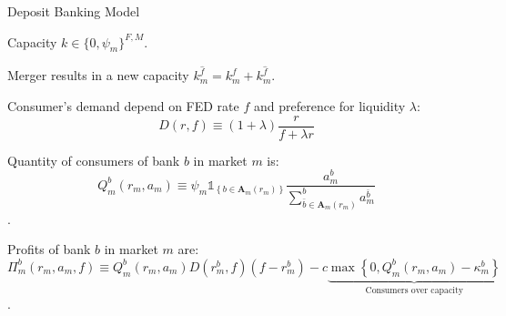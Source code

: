 \documentclass[notes,10.2pt, aspectratio=169]{beamer}
\newenvironment{wideitemize}{\itemize\addtolength{\itemsep}{10pt}}{\enditemize}
\begin{document}
\begin{frame}{  Deposit Banking Model}
  \vspace{0.2cm}
\begin{wideitemize}
  \item Capacity $k \in \{ 0, \psi_m\}^{F,M}$.

  \item Merger results in a new capacity $k^{\hat{f}}_m = k^f_m + k^{\hat{f}}_m$.
  \item Consumer's demand depend on FED rate $f$ and preference for liquidity $\lambda$:
  $$D(r, f) \equiv(1+\lambda) \frac{r}{f+\lambda r}$$
  \item Quantity of consumers of bank $b$ in market $m$ is:
  $$Q_m^b\left(r_m, a_m\right) \equiv \psi_m \mathbb{1}_{\left\{b \in \mathbf{A}_m\left(r_m\right)\right\}} \frac{a_m^b}{\sum_{\bar{b} \in \mathbf{A}_m\left(r_m\right)}^b a_m^{\bar{b}}}$$.
  \item Profits of bank $b$ in market $m$ are:
  $$\Pi_m^b\left(r_m, a_m, f\right) \equiv {Q_m^b\left(r_m, a_m\right)} D\left(r_m^b, f\right) \left(f-r_m^b\right) -c \underbrace{\max \left\{0, Q_m^b\left(r_m, a_m\right)-\kappa_m^b\right\}}_{\text{Consumers over capacity}}$$.

\end{wideitemize}

  \end{frame}
  
\end{document}
